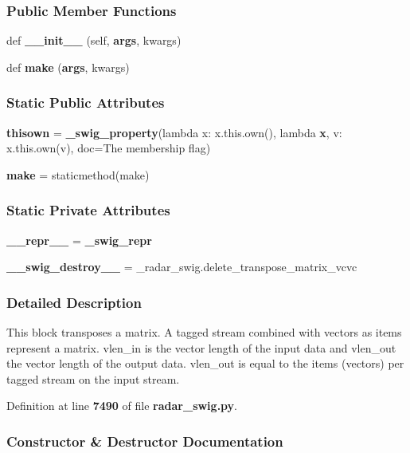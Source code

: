 \subsubsection*{Public Member Functions}
\begin{DoxyCompactItemize}
\item 
def {\bf \+\_\+\+\_\+init\+\_\+\+\_\+} (self, {\bf args}, kwargs)
\item 
def {\bf make} ({\bf args}, kwargs)
\end{DoxyCompactItemize}
\subsubsection*{Static Public Attributes}
\begin{DoxyCompactItemize}
\item 
{\bf thisown} = {\bf \+\_\+swig\+\_\+property}(lambda x\+: x.\+this.\+own(), lambda {\bf x}, v\+: x.\+this.\+own(v), doc=\textquotesingle{}The membership flag\textquotesingle{})
\item 
{\bf make} = staticmethod(make)
\end{DoxyCompactItemize}
\subsubsection*{Static Private Attributes}
\begin{DoxyCompactItemize}
\item 
{\bf \+\_\+\+\_\+repr\+\_\+\+\_\+} = {\bf \+\_\+swig\+\_\+repr}
\item 
{\bf \+\_\+\+\_\+swig\+\_\+destroy\+\_\+\+\_\+} = \+\_\+radar\+\_\+swig.\+delete\+\_\+transpose\+\_\+matrix\+\_\+vcvc
\end{DoxyCompactItemize}


\subsubsection{Detailed Description}
\begin{DoxyVerb}This block transposes a matrix. A tagged stream combined with vectors as items represent a matrix. vlen_in is the vector length of the input data and vlen_out the vector length of the output data. vlen_out is equal to the items (vectors) per tagged stream on the input stream.\end{DoxyVerb}
 

Definition at line {\bf 7490} of file {\bf radar\+\_\+swig.\+py}.



\subsubsection{Constructor \& Destructor Documentation}
